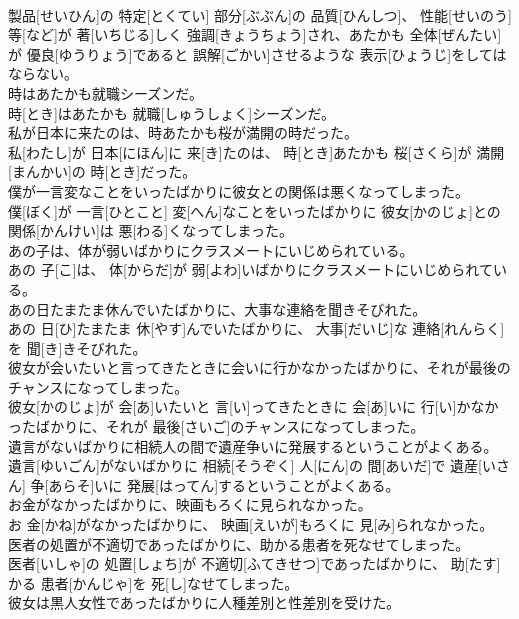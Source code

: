 \documentclass[8pt]{extreport}
\begin{document}
\begin{CJK}{UTF8}{min}
\\	製品[せいひん]の 特定[とくてい] 部分[ぶぶん]の 品質[ひんしつ]、 性能[せいのう] 等[など]が 著[いちじる]しく 強調[きょうちょう]され、あたかも 全体[ぜんたい]が 優良[ゆうりょう]であると 誤解[ごかい]させるような 表示[ひょうじ]をしてはならない。
\\	時はあたかも就職シーズンだ。	
\\	時[とき]はあたかも 就職[しゅうしょく]シーズンだ。
\\	私が日本に来たのは、時あたかも桜が満開の時だった。	
\\	私[わたし]が 日本[にほん]に 来[き]たのは、 時[とき]あたかも 桜[さくら]が 満開[まんかい]の 時[とき]だった。
\\	僕が一言変なことをいったばかりに彼女との関係は悪くなってしまった。	
\\	僕[ぼく]が 一言[ひとこと] 変[へん]なことをいったばかりに 彼女[かのじょ]との 関係[かんけい]は 悪[わる]くなってしまった。
\\	あの子は、体が弱いばかりにクラスメートにいじめられている。	
\\	あの 子[こ]は、 体[からだ]が 弱[よわ]いばかりにクラスメートにいじめられている。
\\	あの日たまたま休んでいたばかりに、大事な連絡を聞きそびれた。	
\\	あの 日[ひ]たまたま 休[やす]んでいたばかりに、 大事[だいじ]な 連絡[れんらく]を 聞[き]きそびれた。
\\	彼女が会いたいと言ってきたときに会いに行かなかったばかりに、それが最後のチャンスになってしまった。	
\\	彼女[かのじょ]が 会[あ]いたいと 言[い]ってきたときに 会[あ]いに 行[い]かなかったばかりに、それが 最後[さいご]のチャンスになってしまった。
\\	遺言がないばかりに相続人の間で遺産争いに発展するということがよくある。	
\\	遺言[ゆいごん]がないばかりに 相続[そうぞく] 人[にん]の 間[あいだ]で 遺産[いさん] 争[あらそ]いに 発展[はってん]するということがよくある。
\\	お金がなかったばかりに、映画もろくに見られなかった。	
\\	お 金[かね]がなかったばかりに、 映画[えいが]もろくに 見[み]られなかった。
\\	医者の処置が不適切であったばかりに、助かる患者を死なせてしまった。	
\\	医者[いしゃ]の 処置[しょち]が 不適切[ふてきせつ]であったばかりに、 助[たす]かる 患者[かんじゃ]を 死[し]なせてしまった。
\\	彼女は黒人女性であったばかりに人種差別と性差別を受けた。	

\end{CJK}
\end{document}
